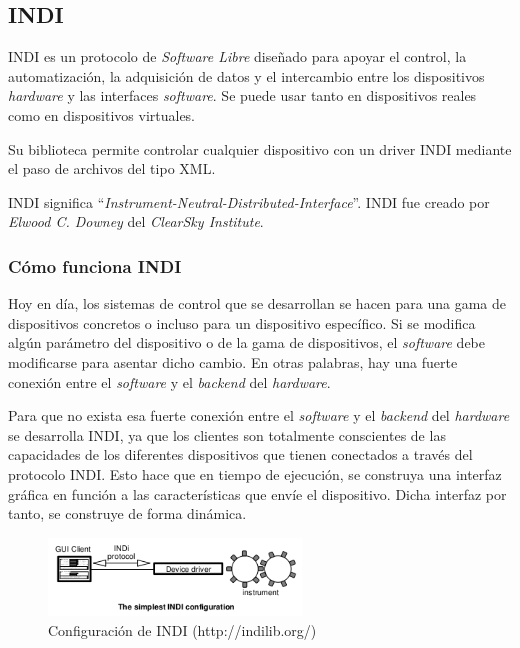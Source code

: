 \subsection{INDI}
INDI es un protocolo de \textit{Software Libre} diseñado para apoyar el control, la automatización, la adquisición de datos y el intercambio entre los dispositivos \textit{hardware} y las interfaces \textit{software}. Se puede usar tanto en dispositivos reales como en dispositivos virtuales.

Su biblioteca permite controlar cualquier dispositivo con un driver INDI mediante el paso de archivos del tipo XML.

INDI significa “\textit{Instrument-Neutral-Distributed-Interface}”. INDI fue creado por \textit{Elwood C. Downey} del \textit{ClearSky Institute}\cite{INDI}.

\subsubsection{Cómo funciona INDI}
Hoy en día, los sistemas de control que se desarrollan se hacen para una gama de dispositivos concretos o incluso para un dispositivo específico. Si se modifica algún parámetro del dispositivo o de la gama de dispositivos, el \textit{software} debe modificarse para asentar dicho cambio. En otras palabras, hay una fuerte conexión entre el \textit{software} y el \textit{backend} del \textit{hardware}.

Para que no exista esa fuerte conexión entre el \textit{software} y el \textit{backend} del \textit{hardware} se desarrolla INDI,  ya que los clientes son totalmente conscientes de las capacidades de los diferentes dispositivos que tienen conectados a través del protocolo INDI. Esto hace que en tiempo de ejecución, se construya una interfaz gráfica en función a las características que envíe el dispositivo. Dicha interfaz por tanto, se construye de forma dinámica.

\begin{figure}[htb]
\centering
\includegraphics[width=0.6\textwidth]{./imagenes/funcionINDI}
\caption{Configuración de INDI (http://indilib.org/)} \label{fig:funcionINDI}
\end{figure}

